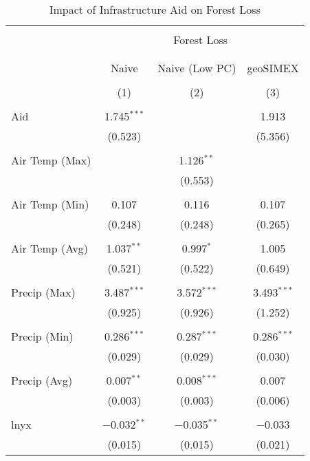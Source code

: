 
\begin{table}[!htbp] \centering 
  \caption{Impact of Infrastructure Aid on Forest Loss} 
  \label{} 
\begin{tabular}{@{\extracolsep{5pt}}lccc} 
\\[-1.8ex]\hline 
\hline \\[-1.8ex] 
 & \multicolumn{3}{c}{Forest Loss} \\ 
\cline{2-4} 
\\[-1.8ex] & \multicolumn{3}{c}{} \\ 
 & Naive & Naive (Low PC) & geoSIMEX \\ 
\\[-1.8ex] & (1) & (2) & (3)\\ 
\hline \\[-1.8ex] 
 Aid & 1.745$^{***}$ &  & 1.913 \\ 
  & (0.523) &  & (5.356) \\ 
  & & & \\ 
 Air Temp (Max) &  & 1.126$^{**}$ &  \\ 
  &  & (0.553) &  \\ 
  & & & \\ 
 Air Temp (Min) & 0.107 & 0.116 & 0.107 \\ 
  & (0.248) & (0.248) & (0.265) \\ 
  & & & \\ 
 Air Temp (Avg) & 1.037$^{**}$ & 0.997$^{*}$ & 1.005 \\ 
  & (0.521) & (0.522) & (0.649) \\ 
  & & & \\ 
 Precip (Max) & 3.487$^{***}$ & 3.572$^{***}$ & 3.493$^{***}$ \\ 
  & (0.925) & (0.926) & (1.252) \\ 
  & & & \\ 
 Precip  (Min) & 0.286$^{***}$ & 0.287$^{***}$ & 0.286$^{***}$ \\ 
  & (0.029) & (0.029) & (0.030) \\ 
  & & & \\ 
 Precip  (Avg) & 0.007$^{**}$ & 0.008$^{***}$ & 0.007 \\ 
  & (0.003) & (0.003) & (0.006) \\ 
  & & & \\ 
 lnyx & $-$0.032$^{**}$ & $-$0.035$^{**}$ & $-$0.033 \\ 
  & (0.015) & (0.015) & (0.021) \\ 

\end{tabular}
\end{table}
